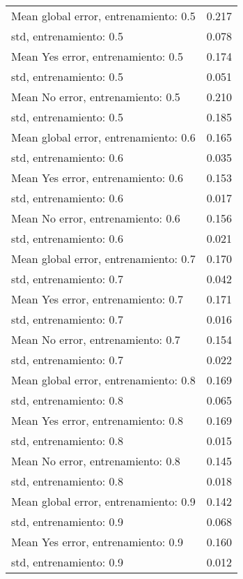 \begin{longtable}{p{4cm}|p{1.5cm}}
Mean global error, entrenamiento: 0.5 &        0.217 \\
std, entrenamiento: 0.5               &        0.078 \\
Mean Yes error, entrenamiento: 0.5    &        0.174 \\
std, entrenamiento: 0.5               &        0.051 \\
Mean No error, entrenamiento: 0.5     &        0.210 \\
std, entrenamiento: 0.5               &        0.185 \\
Mean global error, entrenamiento: 0.6 &        0.165 \\
std, entrenamiento: 0.6               &        0.035 \\
Mean Yes error, entrenamiento: 0.6    &        0.153 \\
std, entrenamiento: 0.6               &        0.017 \\
Mean No error, entrenamiento: 0.6     &        0.156 \\
std, entrenamiento: 0.6               &        0.021 \\
Mean global error, entrenamiento: 0.7 &        0.170 \\
std, entrenamiento: 0.7               &        0.042 \\
Mean Yes error, entrenamiento: 0.7    &        0.171 \\
std, entrenamiento: 0.7               &        0.016 \\
Mean No error, entrenamiento: 0.7     &        0.154 \\
std, entrenamiento: 0.7               &        0.022 \\
Mean global error, entrenamiento: 0.8 &        0.169 \\
std, entrenamiento: 0.8               &        0.065 \\
Mean Yes error, entrenamiento: 0.8    &        0.169 \\
std, entrenamiento: 0.8               &        0.015 \\
Mean No error, entrenamiento: 0.8     &        0.145 \\
std, entrenamiento: 0.8               &        0.018 \\
Mean global error, entrenamiento: 0.9 &        0.142 \\
std, entrenamiento: 0.9               &        0.068 \\
Mean Yes error, entrenamiento: 0.9    &        0.160 \\
std, entrenamiento: 0.9               &        0.012 \\

\end{longtable}
